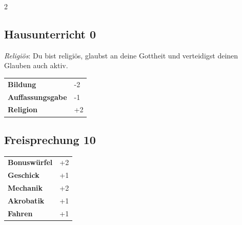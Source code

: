 \begin{multicols}{2}
\begin{tcolorbox}

\end{tcolorbox}

\begin{tcolorbox}
    \subsection*{Hausunterricht \hfill \small{0 }}
    \tcblower
\textit{Religiös}: Du bist religiös, glaubst an deine Gottheit und verteidigst deinen Glauben auch aktiv.


\vspace{3mm}

\begin{tabular}{@{}ll@{}}
    \textbf{Bildung} & -2\\
    \textbf{Auffassungsgabe} & -1\\
    \textbf{Religion} & +2\\
\end{tabular}


\end{tcolorbox}

\begin{tcolorbox}
    \subsection*{Freisprechung \hfill \small{10 }}
    \tcblower




\begin{tabular}{@{}ll@{}}
    \textbf{Bonuswürfel} & +2\\
    \textbf{Geschick} & +1\\
    \textbf{Mechanik} & +2\\
    \textbf{Akrobatik} & +1\\
    \textbf{Fahren} & +1\\
\end{tabular}


\end{tcolorbox}
\end{multicols}
